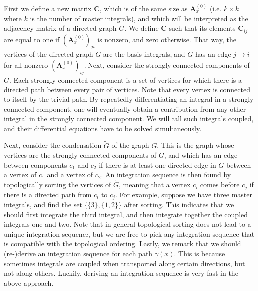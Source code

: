 \documentclass{article}
\begin{document}
First we define a new matrix $\mathbf{C}$, which is of the same size as $\mathbf{A}_x^{(0)}$ (i.e. $k\times k$ where $k$ is the number of master integrals), and which will be interpreted as the adjacency matrix of a directed graph $G$. We define $\mathbf{C}$ such that its elements $\mathbf{C}_{ij}$ are equal to one if $(\mathbf{A}_x^{(0)})_{ji}$ is nonzero, and zero otherwise. That way, the vertices of the directed graph $G$ are the basis integrals, and $G$ has an edge $j \rightarrow i$ for all nonzero $(\mathbf{A}_x^{(0)})_{ij}$. Next, consider the strongly connected components of $G$. Each strongly connected component is a set of vertices for which there is a directed path between every pair of vertices. Note that every vertex is connected to itself by the trivial path. By repeatedly differentiating an integral in a strongly connected component, one will eventually obtain a contribution from any other integral in the strongly connected component. We will call such integrals coupled, and their differential equations have to be solved simultaneously.

Next, consider the condensation $\tilde{G}$ of the graph $G$. This is the graph whose vertices are the strongly connected components of $G$, and which has an edge between components $c_1$ and $c_2$ if there is at least one directed edge in $G$ between a vertex of $c_1$ and a vertex of $c_2$. An integration sequence is then found by topologically sorting the vertices of $\tilde{G}$, meaning that a vertex $c_i$ comes before $c_j$ if there is a directed path from $c_i$ to $c_j$. For example, suppose we have three master integrals, and find the set $\{\{3\},\{1,2\}\}$ after sorting. This indicates that we should first integrate the third integral, and then integrate together the coupled integrals one and two. Note that in general topological sorting does not lead to a unique integration sequence, but we are free to pick any integration sequence that is compatible with the topological ordering. Lastly, we remark that we should (re-)derive an integration sequence for each path $\gamma(x)$. This is because sometimes integrals are coupled when transported along certain directions, but not along others. Luckily, deriving an integration sequence is very fast in the above approach.
\end{document}

